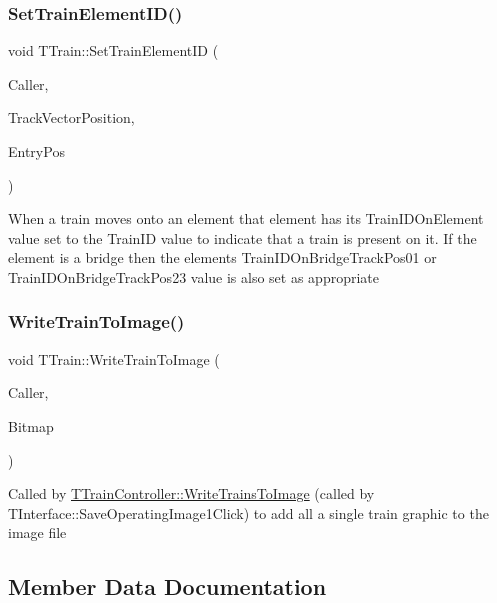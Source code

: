 \subsubsection{\texorpdfstring{Set\+Train\+Element\+I\+D()}{SetTrainElementID()}}
{\footnotesize\ttfamily void T\+Train\+::\+Set\+Train\+Element\+ID (\begin{DoxyParamCaption}\item[{int}]{Caller,  }\item[{unsigned int}]{Track\+Vector\+Position,  }\item[{int}]{Entry\+Pos }\end{DoxyParamCaption})\hspace{0.3cm}{\ttfamily [private]}}

When a train moves onto an element that element has its Train\+I\+D\+On\+Element value set to the Train\+ID value to indicate that a train is present on it. If the element is a bridge then the element\textquotesingle{}s Train\+I\+D\+On\+Bridge\+Track\+Pos01 or Train\+I\+D\+On\+Bridge\+Track\+Pos23 value is also set as appropriate \mbox{\label{class_t_train_a86107a63225b0500b29e049f13545fff}} 
\subsubsection{\texorpdfstring{Write\+Train\+To\+Image()}{WriteTrainToImage()}}
{\footnotesize\ttfamily void T\+Train\+::\+Write\+Train\+To\+Image (\begin{DoxyParamCaption}\item[{int}]{Caller,  }\item[{Graphics\+::\+T\+Bitmap $\ast$}]{Bitmap }\end{DoxyParamCaption})\hspace{0.3cm}{\ttfamily [private]}}

Called by \mbox{\hyperlink{class_t_train_controller_aa5e441a9ec80e5076b2c05c2bb6f3fd3}{T\+Train\+Controller\+::\+Write\+Trains\+To\+Image}} (called by T\+Interface\+::\+Save\+Operating\+Image1\+Click) to add all a single train graphic to the image file 

\subsection{Member Data Documentation}
\mbox{\label{class_t_train_a8c94580b79a8ad1ad0fce51f0abba822}} 
